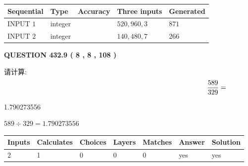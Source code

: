 \documentclass{ctexart}
\begin{document}
   
  
  
\noindent\begin{tabular}{|l|l|l|l|l|}
\hline
 Sequential & Type & Accuracy & Three inputs & Generated \\ 
\hline
 
 
  INPUT $  1 $ & integer &  & $
 520
 , 
 960
 , 
 3
 $ & $ 871 $ 
 \\  \hline  
 
 
  INPUT $  2 $ & integer &  & $
 140
 , 
 480
 , 
 7
 $ & $ 266 $ 
 \\  \hline  
 \end{tabular}
   
   
  
\vspace{0.2in}
  
{\textbf{\Large{QUESTION
432.9 
 ( 8 , 8 , 108 )
}}}
  
  
 
请计算:
\begin{equation}
\frac { %
589 }  {  %
329} = \nonumber
\end{equation}
 
 
 
\noindent{}
 
 

1.790273556
 
 
\noindent{}
 
 

 
 
 
\noindent{}
 
 

$ %
589 \div  %
329=   %
1.790273556$
 
 
\noindent{}
 
 

 
   
   
   
   
\noindent\begin{tabular}{|l|l|l|l|l|l|l|}
 \hline
Inputs & Calculates & Choices & Layers & Matches & Answer & Solution \\ \hline
 2  & 
 1  & 
 0
  & 
 0  & 
 0  & 
  yes & 
  yes 
  \\ \hline
 \end{tabular}
   
\end{document}
